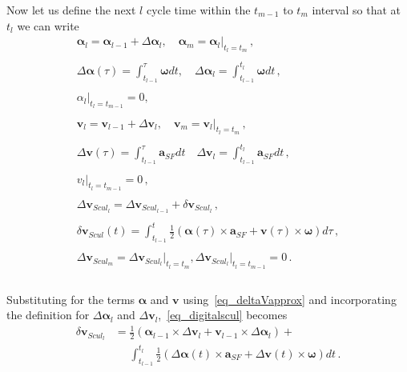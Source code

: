 \documentclass[journal]{IEEEtran}
\begin{document}
Now let us define the next $l$ cycle time within the $t_{m-1}$ to $t_{m}$ interval so that at $t_l$ we can write
\begin{equation}\label{eq_digitalscul}
\begin{array}{c}
\boldsymbol{\alpha}_l = \boldsymbol{\alpha}_{l-1}+\Delta\boldsymbol{\alpha}_l, \quad  \boldsymbol{\alpha}_m = \boldsymbol{\alpha}_l\bigg\rvert_{t_l=t_m}\,,\\
\\
\Delta\boldsymbol{\alpha}(\tau) = \int_{t_{l-1}}^{\tau}\boldsymbol{\omega}dt, \quad \Delta\boldsymbol{\alpha}_l = \int_{t_{l-1}}^{t_l}\boldsymbol{\omega}dt\,,\\
\\
{\alpha}_l\bigg\rvert_{t_l=t_{m-1}} = 0,\\
\\
\boldsymbol{v}_l = \boldsymbol{v}_{l-1}+\Delta\boldsymbol{v}_l, \quad   \boldsymbol{v}_m = \boldsymbol{v}_l\bigg\rvert_{t_l=t_m}\,,\\
\\
\Delta\boldsymbol{v}(\tau) = \int_{t_{l-1}}^{\tau}\boldsymbol{a}_{SF}dt \quad \Delta\boldsymbol{v}_l = \int_{t_{l-1}}^{t_l}\boldsymbol{a}_{SF}dt\,,\\
\\
{v}_l\bigg\rvert_{t_l=t_{m-1}} = 0\,,\\
\\
\Delta\boldsymbol{v}_{Scul_l} =\Delta\boldsymbol{v}_{Scul_{l-1}} +\delta\boldsymbol{v}_{Scul_l}\,,\\
\\
\delta\boldsymbol{v}_{Scul}(t) =\int_{t_{l-1}}^{t}\frac{1}{2}  \left(\boldsymbol{\alpha}(\tau)\times \boldsymbol{a}_{SF} +\boldsymbol{v}(\tau)\times \boldsymbol{\omega}\right)d\tau\,,\\
\\
\Delta\boldsymbol{v}_{Scul_m} =\Delta\boldsymbol{v}_{Scul_{l}}\bigg\rvert_{t_l=t_m}, \Delta\boldsymbol{v}_{Scul_{l}}\bigg\rvert_{t_l=t_{m-1}}=0\,. \\
\\
\end{array}
\end{equation}

Substituting for the terms $\boldsymbol{\alpha}$ and $\boldsymbol{v}$ using~\eqref{eq_deltaVapprox} and incorporating the definition for $\Delta\boldsymbol{\alpha}_l$ and $\Delta\boldsymbol{v}_l$,~\eqref{eq_digitalscul} becomes
\begin{equation}\label{eq_digitalsculnewnnn}
\begin{split}
\delta\boldsymbol{v}_{Scul_l} &=\frac{1}{2}\left( \boldsymbol{\alpha}_{l-1}\times  \Delta\boldsymbol{v}_l + \boldsymbol{v}_{l-1} \times \Delta\boldsymbol{\alpha}_l  \right)+\\
&\phantom{=}\int_{t_{l-1}}^{t_l}\frac{1}{2}  \left(\Delta\boldsymbol{\alpha}(t)\times \boldsymbol{a}_{SF} +\Delta\boldsymbol{v}(t)\times \boldsymbol{\omega}\right)dt\,.\\
\end{split}
\end{equation}
\end{document}
